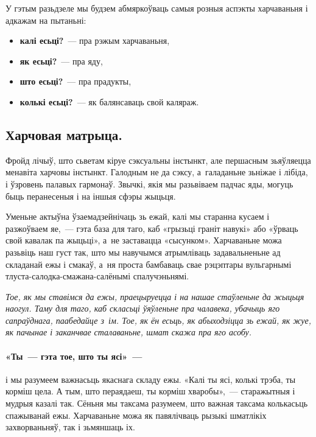 У гэтым разьдзеле мы будзем абмяркоўваць самыя розныя аспэкты харчаваньня і адкажам на пытаньні: 

\begin{itemize}
  \item \textbf{калі есьці?}~--- пра рэжым харчаваньня,
  \item \textbf{як есьці?}~--- пра яду,
  \item \textbf{што есьці?}~--- пра прадукты,
  \item \textbf{колькі есьці?}~--- як балянсаваць свой каляраж.
\end{itemize}

\subsection*{Харчовая матрыца.}
Фройд лічыў, што сьветам кіруе сэксуальны інстынкт, але першасным зьяўляецца менавіта харчовы інстынкт. Галодным не да сэксу, а~галаданьне зьніжае і лібіда, і ўзровень палавых гармонаў. Звычкі, якія мы разьвіваем падчас яды, могуць быць перанесеныя і на іншыя сфэры жыцьця. 


Уменьне актыўна ўзаемадзейнічаць зь ежай, калі мы старанна кусаем і разжоўваем яе,~--- гэта база для таго, каб «грызьці граніт навукі» або «ўрваць свой кавалак па жыцьці», а~не заставацца «сысунком». Харчаваньне можа разьвіць наш густ так, што мы навучымся атрымліваць задавальненьне ад складанай ежы і смакаў, а~ня проста бамбаваць свае рэцэптары вульгарнымі тлуста-салодка-смажана-салёнымі спалучэньнямі.

\emph{Тое, як мы ставімся да ежы, праецыруецца і на нашае стаўленьне да жыцьця наогул. Таму для таго, каб скласьці ўяўленьне пра чалавека, убачыць яго сапраўднага, паабедайце з~ім. Тое, як ён есьць, як абыходзіцца зь ежай, як жуе, як пачынае і заканчвае сталаваньне, шмат скажа пра яго асобу.}

\paragraph{«Ты~--- гэта тое, што ты ясі»~---} і мы разумеем важнасьць якаснага складу ежы. «Калі ты ясі, колькі трэба, ты корміш цела. А тым, што пераядаеш, ты корміш хваробы»,~--- старажытныя і мудрыя казалі так. Сёньня мы таксама разумеем, што важная таксама колькасьць спажыванай ежы. Харчаваньне можа як павялічваць рызыкі шматлікіх захворваньняў, так і зьмяншаць іх.

